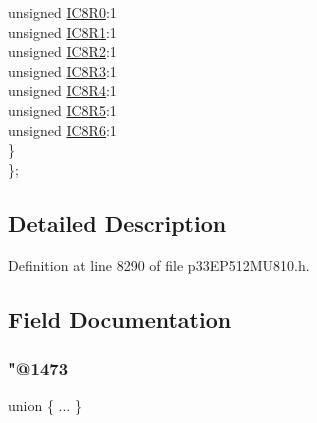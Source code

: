 \begin{DoxyCompactItemize}
\begin{tabbing}
\>\>unsigned \hyperlink{structtag_r_p_i_n_r10_b_i_t_s_ac8fc23a8de3ef049b4d9d35de1cd1592}{IC8R0}:1\\
\>\>unsigned \hyperlink{structtag_r_p_i_n_r10_b_i_t_s_a825fe8c989c81322ad6a5b66ab425280}{IC8R1}:1\\
\>\>unsigned \hyperlink{structtag_r_p_i_n_r10_b_i_t_s_a8c7ef9d8c0ced824fd7e23e045421974}{IC8R2}:1\\
\>\>unsigned \hyperlink{structtag_r_p_i_n_r10_b_i_t_s_a33069acd6514078cbe87bc42f06003e5}{IC8R3}:1\\
\>\>unsigned \hyperlink{structtag_r_p_i_n_r10_b_i_t_s_aa9fb832cad58c6c3806552c07ded489a}{IC8R4}:1\\
\>\>unsigned \hyperlink{structtag_r_p_i_n_r10_b_i_t_s_ab7b2f8546060699d054e431b5ba88b98}{IC8R5}:1\\
\>\>unsigned \hyperlink{structtag_r_p_i_n_r10_b_i_t_s_abe369cb288ac08b2fba0dd34371efc3e}{IC8R6}:1\\
\>\} \\
\}; \\

\end{tabbing}\end{DoxyCompactItemize}


\subsection{Detailed Description}


Definition at line 8290 of file p33\+E\+P512\+M\+U810.\+h.



\subsection{Field Documentation}
\mbox{\label{structtag_r_p_i_n_r10_b_i_t_s_ac0a530293c6b1a24677b23883c8e82a1}} 
\subsubsection{\texorpdfstring{"@1473}{@1473}}
{\footnotesize\ttfamily union \{ ... \} }

\mbox{\label{structtag_r_p_i_n_r10_b_i_t_s_adf71f3d8410c1f1dbbc96680a92c49af}} 
